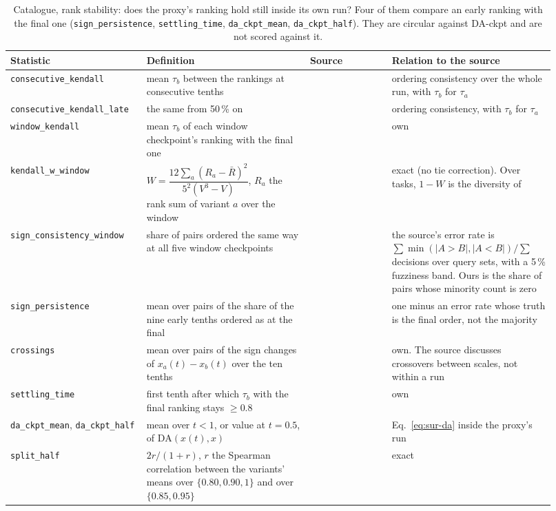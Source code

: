 \begin{table}[h]
\centering
\scriptsize
\begin{tabular}{@{}p{0.215\linewidth}p{0.28\linewidth}p{0.14\linewidth}p{0.285\linewidth}@{}}
\toprule
\textbf{Statistic} & \textbf{Definition} & \textbf{Source} & \textbf{Relation to the source} \\
\midrule
\texttt{consecutive\_kendall} & mean $\tau_b$ between the rankings at consecutive tenths & \citet{kydlicek_finetasks_nodate} & ordering consistency over the whole run, with $\tau_b$ for $\tau_a$ \\
\texttt{consecutive\_kendall\_late} & the same from 50\,\% on & \citet{kydlicek_finetasks_nodate} & ordering consistency, with $\tau_b$ for $\tau_a$ \\
\texttt{window\_kendall} & mean $\tau_b$ of each window checkpoint's ranking with the final one & \citet{heineman_signal_2025} & own \\
\texttt{kendall\_w\_window} & $W = \dfrac{12\sum_a (R_a - \bar{R})^2}{5^2 (V^3 - V)}$, $R_a$ the rank sum of variant $a$ over the window & \citet{kendall_problem_1939} & exact (no tie correction). Over tasks, $1 - W$ is the diversity of \citet{zhang_inherent_2024} \\
\texttt{sign\_consistency\_window} & share of pairs ordered the same way at all five window checkpoints & \citet{buckley_evaluating_2000} & the source's error rate is $\sum \min(|A{>}B|, |A{<}B|) / \sum$ decisions over query sets, with a 5\,\% fuzziness band. Ours is the share of pairs whose minority count is zero \\
\texttt{sign\_persistence} & mean over pairs of the share of the nine early tenths ordered as at the final & \citet{buckley_evaluating_2000} & one minus an error rate whose truth is the final order, not the majority \\
\texttt{crossings} & mean over pairs of the sign changes of $x_a(t) - x_b(t)$ over the ten tenths & \citet{magnusson_datadecide_2025} & own. The source discusses crossovers between scales, not within a run \\
\texttt{settling\_time} & first tenth after which $\tau_b$ with the final ranking stays $\geq 0.8$ & \citet{magnusson_datadecide_2025} & own \\
\texttt{da\_ckpt\_mean}, \texttt{da\_ckpt\_half} & mean over $t < 1$, or value at $t = 0.5$, of $\mathrm{DA}(x(t), x)$ & \citet{heineman_signal_2025, magnusson_datadecide_2025} & Eq.~\ref{eq:sur-da} inside the proxy's run \\
\texttt{split\_half} & $2r/(1+r)$, $r$ the Spearman correlation between the variants' means over $\{0.80, 0.90, 1\}$ and over $\{0.85, 0.95\}$ & \citet{spearman_correlation_1910, brown_experimental_1910} & exact \\
\bottomrule
\end{tabular}
\caption{Catalogue, rank stability: does the proxy's ranking hold still inside its own run? Four of them compare an early ranking with the final one (\texttt{sign\_persistence}, \texttt{settling\_time}, \texttt{da\_ckpt\_mean}, \texttt{da\_ckpt\_half}). They are circular against DA-ckpt and are not scored against it.}
\label{tab:sur-stability}
\end{table}

